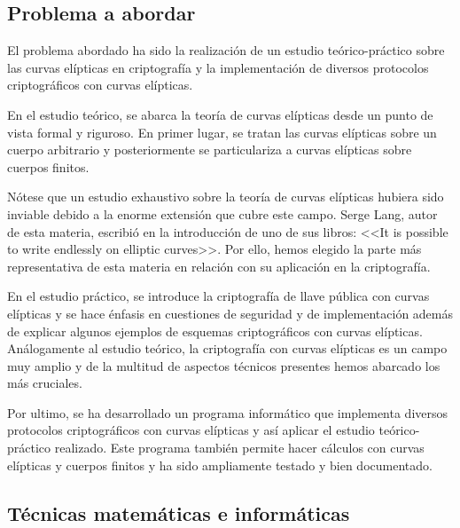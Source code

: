 \subsection{Problema a abordar}
\label{sub:Problema a abordar}


El problema abordado ha sido la realización de un estudio teórico-práctico sobre las curvas elípticas en criptografía y la implementación de diversos protocolos criptográficos con curvas elípticas.

En el estudio teórico, se abarca la teoría de curvas elípticas desde un punto de vista formal y riguroso. En primer lugar, se tratan las curvas elípticas sobre un cuerpo arbitrario y posteriormente se particulariza a curvas elípticas sobre cuerpos finitos.

Nótese que un estudio exhaustivo sobre la teoría de curvas elípticas hubiera sido inviable debido a la enorme extensión que cubre este campo. Serge Lang, autor de esta materia, escribió en la introducción de uno de sus libros: <<It is possible to write endlessly on elliptic curves>>. Por ello, hemos elegido la parte más representativa de esta materia en relación con su aplicación en la criptografía.

En el estudio práctico, se introduce la criptografía de llave pública con curvas elípticas y se hace énfasis en cuestiones de seguridad y de implementación además de explicar algunos ejemplos de esquemas criptográficos con curvas elípticas. Análogamente al estudio teórico, la criptografía con curvas elípticas es un campo muy amplio y de la multitud de aspectos técnicos presentes hemos abarcado los más cruciales.

Por ultimo, se ha desarrollado un programa informático que implementa diversos protocolos criptográficos con curvas elípticas y así aplicar el estudio teórico-práctico realizado. Este programa también permite hacer cálculos con curvas elípticas y cuerpos finitos y ha sido ampliamente testado y bien documentado.

\subsection{Técnicas matemáticas e informáticas}
\label{sub:Técnicas matemáticas e informáticas}

